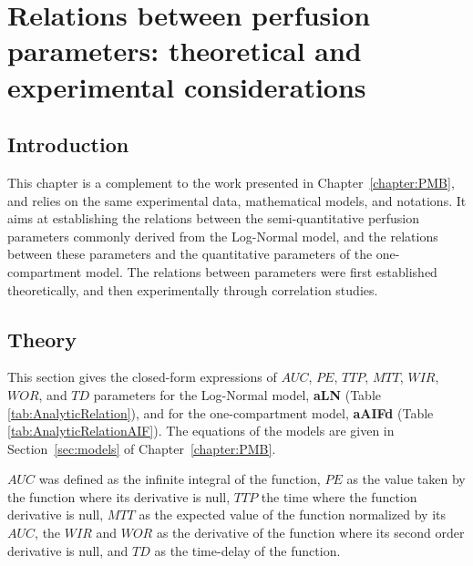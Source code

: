 \chapter{Relations between perfusion parameters: theoretical and experimental considerations}\label{chapter:PMB2}
\section{Introduction}
This chapter is a complement to the work presented in Chapter~\ref{chapter:PMB}, and relies on the same experimental data, mathematical models, and notations.
It aims at establishing the relations between the semi-quantitative perfusion parameters commonly derived from the Log-Normal model, and the relations between these parameters and the quantitative parameters of the one-compartment model.
The relations between parameters were first established theoretically, and then experimentally through correlation studies.

\section{Theory}
This section gives the closed-form expressions of $AUC$, $PE$, $TTP$, $MTT$, $WIR$, $WOR$, and $TD$ parameters for the Log-Normal model, \textbf{aLN} (Table \ref{tab:AnalyticRelation}), and for the one-compartment model, \textbf{aAIFd} (Table \ref{tab:AnalyticRelationAIF}).
The equations of the models are given in Section~\ref{sec:models} of Chapter~\ref{chapter:PMB}.

$AUC$ was defined as the infinite integral of the function, $PE$ as the value taken by the function where its derivative is null, $TTP$ the time where the function derivative is null, $MTT$ as the expected value of the function normalized by its $AUC$, the $WIR$ and $WOR$ as the derivative of the function where its second order derivative is null, and $TD$ as the time-delay of the function.

